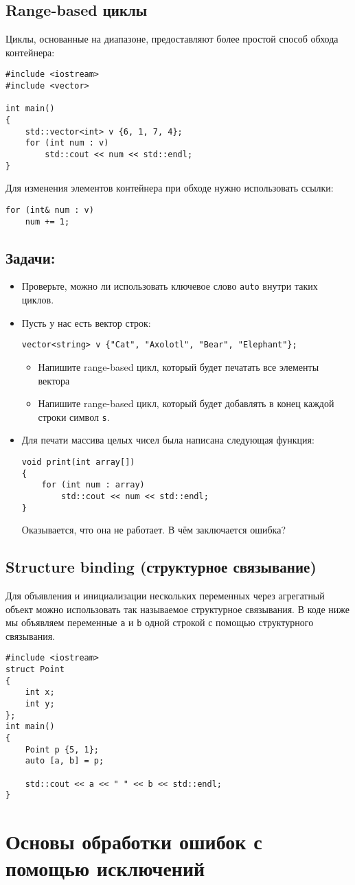 \documentclass{article}
\begin{document}
\newpage
\subsection*{Range-based циклы}
Циклы, основанные на диапазоне, предоставляют более простой способ обхода контейнера:
\begin{lstlisting}
#include <iostream>
#include <vector>

int main()
{
    std::vector<int> v {6, 1, 7, 4};
    for (int num : v)
    	std::cout << num << std::endl;    
}
\end{lstlisting}
Для изменения элементов контейнера при обходе нужно использовать ссылки:
\begin{lstlisting}
for (int& num : v)
    num += 1;    
\end{lstlisting}

\subsection*{Задачи:}
\begin{itemize}
\item Проверьте, можно ли использовать ключевое слово \texttt{auto} внутри таких циклов.
\item Пусть у нас есть вектор строк:
\begin{lstlisting}
vector<string> v {"Cat", "Axolotl", "Bear", "Elephant"};
\end{lstlisting}
\begin{itemize}
\item Напишите range-based цикл, который будет печатать все элементы вектора
\item Напишите range-based цикл, который будет добавлять в конец каждой строки символ \texttt{s}.
\end{itemize}

\item Для печати массива целых чисел была написана следующая функция:
\begin{lstlisting}
void print(int array[]) 
{
    for (int num : array)
        std::cout << num << std::endl;
}
\end{lstlisting}
Оказывается, что она не работает. В чём заключается ошибка?
\end{itemize}

\subsection*{Structure binding (структурное связывание)}
Для объявления и инициализации нескольких переменных через агрегатный объект можно использовать так называемое структурное связывания. В коде ниже мы объявляем переменные \texttt{a} и \texttt{b} одной строкой с помощью структурного связывания.
\begin{lstlisting}
#include <iostream>
struct Point
{
	int x;
	int y;
};
int main() 
{
    Point p {5, 1};
    auto [a, b] = p;
    
    std::cout << a << " " << b << std::endl;
}
\end{lstlisting}

\section*{Основы обработки ошибок с помощью исключений}
\end{document}
